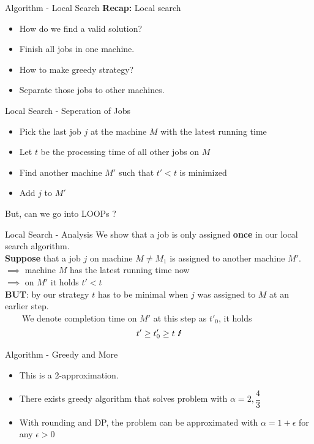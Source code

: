 \documentclass{beamer}
\newcommand*{\brk}{\\[10pt]}
\begin{document}
\begin{frame}{Algorithm - Local Search}
    \textbf{Recap:} Local search 
    \begin{itemize}
        \item<1-> How do we find a valid solution?
        \item<2-> \color{red} Finish all jobs in one machine. \color{black}
        \item<1-> How to make greedy strategy?
        \item<3-> \color{red} Separate those jobs to other machines. \color{black}
    \end{itemize}
\end{frame}

\begin{frame}{Local Search - Seperation of Jobs}
    \begin{itemize}
        \item Pick the last job $j$ at the machine $M$ with the latest running time
        \item Let $t$ be the processing time of all other jobs on $M$
        \item Find another machine $M'$ such that $t' < t$ is minimized
        \item Add $j$ to $M'$
    \end{itemize}
    \pause 
    But, can we go into \color{red} LOOPs \color{black}?
\end{frame}

\begin{frame}{Local Search - Analysis}
    We show that a job is only assigned \textbf{once} in our local search algorithm. \brk 
    \textbf{Suppose} that a job $j$ on machine $M \not= M_1$ is assigned to another machine $M'$. \brk \pause
    $\implies$ machine $M$ has the latest running time now \brk \pause
    $\implies$ on $M'$ it holds $t' < t$ \brk \pause 
    \textbf{BUT}: by our strategy $t$ has to be minimal when $j$ was assigned to $M$ at an earlier step. \brk \pause 
    \ \ \ \ We denote completion time on $M'$ at this step as $t'_0$, it holds 
    \begin{align*}
        t' \geq t'_0 \geq t \ \mbox{\Lightning}
    \end{align*}  
\end{frame}

\begin{frame}{Algorithm - Greedy and More}
    \begin{itemize}
        \item This is a 2-approximation. 
        \item There exists greedy algorithm that solves problem with $\alpha = 2, \dfrac{4}{3}$
        \item With rounding and DP, the problem can be approximated with $\alpha = 1 +\epsilon$ for any $\epsilon > 0$
    \end{itemize}
\end{frame}
\end{document}
